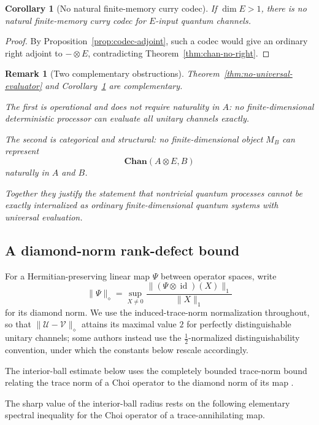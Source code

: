 \documentclass[11pt]{article}
\newtheorem{corollary}[theorem]{Corollary}
\newtheorem{remark}[theorem]{Remark}
\DeclareMathOperator{\id}{id}
\begin{document}
\begin{corollary}[No natural finite-memory curry codec]
\label{cor:no-natural-codec}
If $\dim E>1$, there is no natural finite-memory curry codec for $E$-input
quantum channels.
\end{corollary}

\begin{proof}
By Proposition~\ref{prop:codec-adjoint}, such a codec would give an ordinary
right adjoint to $-\otimes E$, contradicting
Theorem~\ref{thm:chan-no-right}.
\end{proof}

\begin{remark}[Two complementary obstructions]
\label{rem:two-complementary-obstructions}
Theorem~\ref{thm:no-universal-evaluator} and
Corollary~\ref{cor:no-natural-codec} are complementary.

The first is operational and does not require naturality in $A$: no
finite-dimensional deterministic processor can evaluate all unitary channels
exactly.

The second is categorical and structural: no finite-dimensional object $M_B$
can represent
\[
\mathbf{Chan}(A\otimes E,B)
\]
naturally in $A$ and $B$.

Together they justify the statement that nontrivial quantum processes cannot
be exactly internalized as ordinary finite-dimensional quantum systems with
universal evaluation.
\end{remark}

\subsection{A diamond-norm rank-defect bound}

For a Hermitian-preserving linear map $\Psi$ between operator spaces, write
\[
\|\Psi\|_\diamond
=
\sup_{X\neq0}
\frac{\|(\Psi\otimes\id)(X)\|_1}{\|X\|_1}
\]
for its diamond norm. We use the induced-trace-norm normalization throughout,
so that $\|\mathcal U-\mathcal V\|_\diamond$ attains its maximal value $2$ for
perfectly distinguishable unitary channels; some authors instead use the
$\tfrac12$-normalized distinguishability convention, under which the constants
below rescale accordingly.

The interior-ball estimate below uses the completely bounded trace-norm bound
relating the trace norm of a Choi operator to the diamond norm of its map
\cite{Watrous2018, NechitaPuchalaPawelaZyczkowski2018}.

The sharp value of the interior-ball radius rests on the following elementary
spectral inequality for the Choi operator of a trace-annihilating map.
\end{document}
